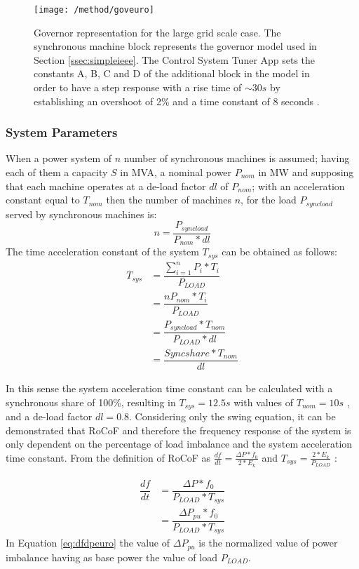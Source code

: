 \begin{figure}[h]
	\centering
	\texttt{[image: /method/goveuro]}
	\caption{Governor representation for the large grid scale case. The synchronous machine block represents the governor model used in Section \ref{ssec:simpleieee}. The Control System Tuner App sets the constants A, B, C and D of the additional block in the model in order to have a step response with a rise time of $ \sim30s $ by establishing an overshoot of 2\% and a time constant of 8 seconds \cite{ogata1999ingenieria}.}
	\label{fig:goveuro}
\end{figure}




\subsubsection{System Parameters}

When a power system of $ n $ number of synchronous machines is assumed; having each of them a capacity $ S $ in MVA, a nominal power $ P_{nom} $ in MW and
supposing that each machine operates at a de-load factor $ dl $ of $ P_{nom} $; with an acceleration constant equal to $ T_{nom} $ then the number of machines $ n $, for the load $ P_{syncload} $ served by synchronous machines is:
\begin{equation}
n=\dfrac{P_{syncload}}{P_{nom}*dl}
\end{equation}
The time acceleration constant of the system $ T_{sys} $ can be obtained as follows:
\begin{align}
T_{sys} &=\dfrac{\sum_{i=1}^nP_i*T_i}{P_{LOAD}}\nonumber \\
&=\dfrac{nP_{nom}*T_i}{P_{LOAD}}\nonumber \\
&=\dfrac{P_{syncload}*T_{nom}}{P_{LOAD}*dl}\nonumber\\
&=\dfrac{Sync share*T_{nom}}{dl} \label{eq:tsyseuro}
\end{align}




In this sense the system acceleration time constant can be calculated with a synchronous share of 100\%, resulting in $ T_{sys}=12.5s $ with values of $ T_{nom}=10s $ \cite{ENTSOE.2016, Anderson.2002}, and a de-load factor $ dl=0.8 $. Considering only the swing equation, it can be demonstrated that RoCoF and therefore the frequency response of the system is only dependent on the percentage of load imbalance and the system acceleration time constant.
From the definition of RoCoF as $ \frac{df}{dt}=\frac{\Delta P*f_0}{2*E_k} $ and $ T_{sys}=\frac{2*E_k}{P_{LOAD}} $ :

\begin{align}
\dfrac{df}{dt} &=\dfrac{\Delta P*f_0}{P_{LOAD}*T_{sys}} \nonumber\\
&=\dfrac{\Delta P_{pu}*f_0}{P_{LOAD}*T_{sys}}
\label{eq:dfdpeuro}
\end{align}
In Equation \eqref{eq:dfdpeuro} the value of $ \Delta P_{pu} $ is the normalized value of power imbalance having as base power the value of load $ P_{LOAD} $.

